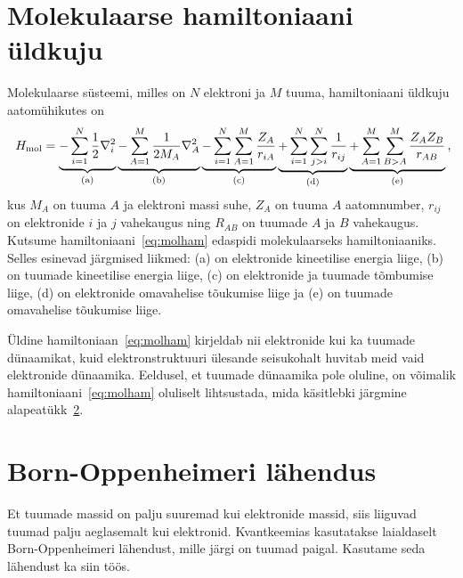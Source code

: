 \documentclass[12pt]{report}
\begin{document}
\section{Molekulaarse hamiltoniaani üldkuju}\label{sec:molhamgen}

Molekulaarse süsteemi, milles on \(N\) elektroni ja \(M\) tuuma, hamiltoniaani üldkuju aatom\-ühikutes on
\begin{align}\label{eq:molham}
    H_\text{mol} =
    \underbrace{- \sum_{i = 1}^N \frac{1}{2} \nabla_i^2}_\text{(a)}
    \underbrace{- \sum_{A = 1}^M \frac{1}{2 M_A} \nabla_A^2}_\text{(b)}
    \underbrace{- \sum_{i = 1}^N \sum_{A = 1}^M \frac{Z_A}{r_{iA}}}_\text{(c)}
    \underbrace{+ \sum_{i = 1}^N \sum_{j > i}^N \frac{1}{r_{ij}}}_\text{(d)}
    \underbrace{+ \sum_{A = 1}^M \sum_{B > A}^M \frac{Z_A Z_B}{r_{AB}}}_\text{(e)} \rlap{,}
\end{align}
kus \(M_A\) on tuuma \(A\) ja elektroni massi suhe, \(Z_A\) on tuuma \(A\) aatomnumber, \(r_{ij}\) on elektronide \(i\) ja \(j\) vahekaugus ning \(R_{AB}\) on tuumade \(A\) ja \(B\) vahekaugus.
Kutsume hamiltoniaani~\eqref{eq:molham} edaspidi molekulaarseks hamiltoniaaniks.
Selles esinevad järgmised liikmed: (a) on elektronide kineetilise energia liige, (b) on tuumade kineetilise energia liige, (c) on elektronide ja tuumade tõmbumise liige, (d) on elektronide omavahelise tõukumise liige ja (e) on tuumade omavahelise tõukumise liige.

Üldine hamiltoniaan~\eqref{eq:molham} kirjeldab nii elektronide kui ka tuumade dünaamikat, kuid elektronstruktuuri ülesande seisukohalt huvitab meid vaid elektronide dünaamika.
Eeldusel, et tuumade dünaamika pole oluline, on võimalik hamiltoniaani~\eqref{eq:molham} oluliselt lihtsustada, mida käsitlebki järgmine alapeatükk~\ref{sec:bornopen}.

\section{Born-Oppenheimeri lähendus}\label{sec:bornopen}

Et tuumade massid on palju suuremad kui elektronide massid, siis liiguvad tuumad palju aeglasemalt kui elektronid.
Kvantkeemias kasutatakse laialdaselt Born-Oppenheimeri lähendust, mille järgi on tuumad paigal.
Kasutame seda lähendust ka siin töös.
\end{document}
